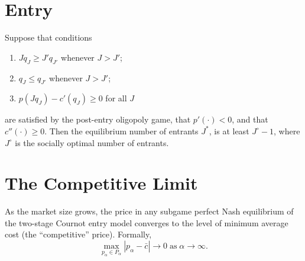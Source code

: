 \section{Entry}

\begin{prop}
    Suppose that conditions
    \begin{enumerate}[label=(A\arabic*)]
        \item $J q_J \geq J' q_{J'}$ whenever $J > J'$;
        \item $q_J \leq q_{J'}$ whenever $J > J'$;
        \item $p(J q_J) - c'(q_J) \geq 0$ for all $J$
    \end{enumerate}
    are satisfied by the post-entry oligopoly game, that $p'(\cdot) < 0$, and that $c''(\cdot) \geq 0$. Then the equilibrium number of entrants $J^*$, is at least $J^\circ - 1$, where $J^\circ$ is the socially optimal number of entrants.
\end{prop}


\section{The Competitive Limit}

\begin{prop}
    As the market size grows, the price in any subgame perfect Nash equilibrium of the two-stage Cournot entry model converges to the level of minimum average cost (the ``competitive'' price). Formally,
    \begin{equation*}
        \max_{p_\alpha \in P_\alpha} |p_\alpha - \bar{c}| \rightarrow 0 \; \text{as} \; \alpha \rightarrow \infty.
    \end{equation*}
\end{prop}
